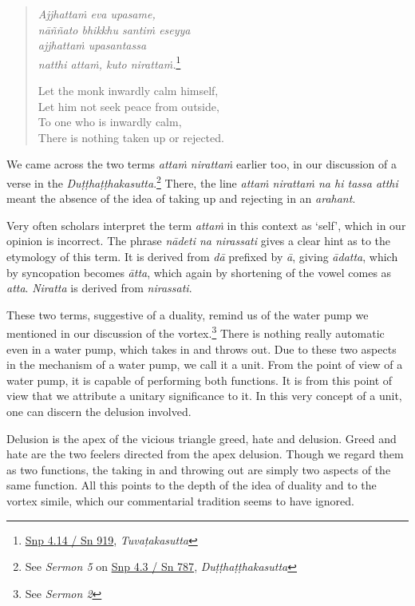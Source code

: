 \clearpage

\begin{quote}
\emph{Ajjhattaṁ eva upasame,}\\
\emph{nāññato bhikkhu santiṁ eseyya}\\
\emph{ajjhattaṁ upasantassa}\\
\emph{natthi attaṁ, kuto nirattaṁ.}\footnote{\href{https://suttacentral.net/snp4.14/pli/ms}{Snp 4.14 / Sn 919}, \emph{Tuvaṭakasutta}}

Let the monk inwardly calm himself,\\
Let him not seek peace from outside,\\
To one who is inwardly calm,\\
There is nothing taken up or rejected.
\end{quote}

We came across the two terms \emph{attaṁ nirattaṁ} earlier too, in our discussion of a verse in the \emph{Duṭṭhaṭṭhakasutta}.\footnote{See \emph{Sermon 5} on \href{https://suttacentral.net/snp4.3/pli/ms}{Snp 4.3 / Sn 787}, \emph{Duṭṭhaṭṭhakasutta}} There, the line \emph{attaṁ nirattaṁ na hi tassa atthi} meant the absence of the idea of taking up and rejecting in an \emph{arahant}.

Very often scholars interpret the term \emph{attaṁ} in this context as `self', which in our opinion is incorrect. The phrase \emph{nādeti na nirassati} gives a clear hint as to the etymology of this term. It is derived from \emph{dā} prefixed by \emph{ā}, giving \emph{ādatta}, which by syncopation becomes \emph{ātta}, which again by shortening of the vowel comes as \emph{atta}. \emph{Niratta} is derived from \emph{nirassati}.

These two terms, suggestive of a duality, remind us of the water pump we mentioned in our discussion of the vortex.\footnote{See \emph{Sermon 2}} There is nothing really automatic even in a water pump, which takes in and throws out. Due to these two aspects in the mechanism of a water pump, we call it a unit. From the point of view of a water pump, it is capable of performing both functions. It is from this point of view that we attribute a unitary significance to it. In this very concept of a unit, one can discern the delusion involved.

Delusion is the apex of the vicious triangle greed, hate and delusion. Greed and hate are the two feelers directed from the apex delusion. Though we regard them as two functions, the taking in and throwing out are simply two aspects of the same function. All this points to the depth of the idea of duality and to the vortex simile, which our commentarial tradition seems to have ignored.

